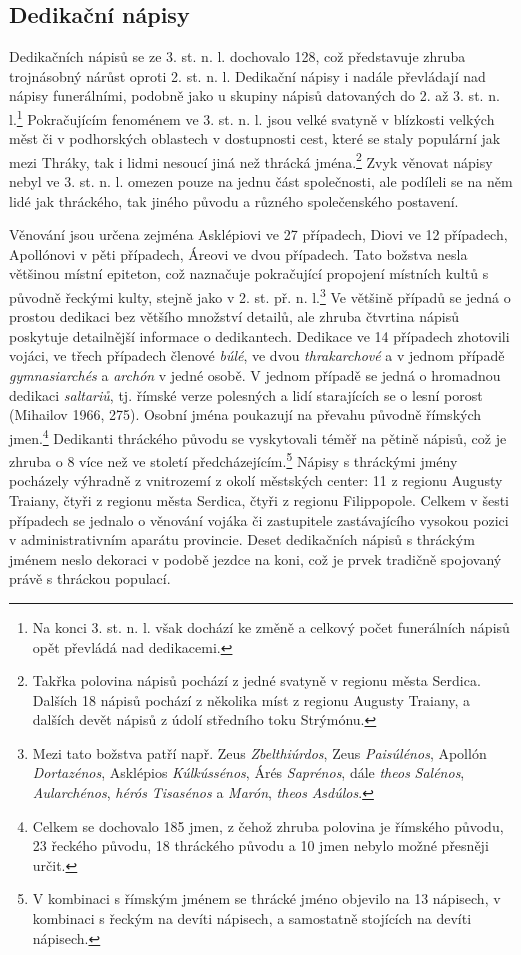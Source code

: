 \subsection[dedikační-nápisy-15]{Dedikační nápisy}

Dedikačních nápisů se ze 3. st. n. l. dochovalo 128, což představuje zhruba trojnásobný nárůst oproti 2. st. n. l. Dedikační nápisy i nadále převládají nad nápisy funerálními, podobně jako u skupiny nápisů datovaných do 2. až 3. st. n. l.\footnote{Na konci 3. st. n. l. však dochází ke změně a celkový počet funerálních nápisů opět převládá nad dedikacemi.} Pokračujícím fenoménem ve 3. st. n. l. jsou velké svatyně v blízkosti velkých měst či v podhorských oblastech v dostupnosti cest, které se staly populární jak mezi Thráky, tak i lidmi nesoucí jiná než thrácká jména.\footnote{Takřka polovina nápisů pochází z jedné svatyně v regionu města Serdica. Dalších 18 nápisů pochází z několika míst z regionu Augusty Traiany, a dalších devět nápisů z údolí středního toku Strýmónu.} Zvyk věnovat nápisy nebyl ve 3. st. n. l. omezen pouze na jednu část společnosti, ale podíleli se na něm lidé jak thráckého, tak jiného původu a různého společenského postavení.

Věnování jsou určena zejména Asklépiovi ve 27 případech, Diovi ve 12 případech, Apollónovi v pěti případech, Áreovi ve dvou případech. Tato božstva nesla většinou místní epiteton, což naznačuje pokračující propojení místních kultů s původně řeckými kulty, stejně jako v 2. st. př. n. l.\footnote{Mezi tato božstva patří např. Zeus {\em Zbelthiúrdos}, Zeus {\em Paisúlénos}, Apollón {\em Dortazénos}, Asklépios {\em Kúlkússénos}, Árés {\em Saprénos}, dále {\em theos} {\em Salénos}, {\em Aularchénos}, {\em hérós} {\em Tisasénos} a {\em Marón}, {\em theos} {\em Asdúlos}.} Ve většině případů se jedná o prostou dedikaci bez většího množství detailů, ale zhruba čtvrtina nápisů poskytuje detailnější informace o dedikantech. Dedikace ve 14 případech zhotovili vojáci, ve třech případech členové {\em búlé}, ve dvou {\em thrakarchové} a v jednom případě {\em gymnasiarchés} a {\em archón} v jedné osobě. V jednom případě se jedná o hromadnou dedikaci {\em saltariů}, tj. římské verze polesných a lidí starajících se o lesní porost (Mihailov 1966, 275). Osobní jména poukazují na převahu původně římských jmen.\footnote{Celkem se dochovalo 185 jmen, z čehož zhruba polovina je římského původu, 23  řeckého původu, 18  thráckého původu a 10  jmen nebylo možné přesněji určit.} Dedikanti thráckého původu se vyskytovali téměř na pětině nápisů, což je zhruba o 8  více než ve století předcházejícím.\footnote{V kombinaci s římským jménem se thrácké jméno objevilo na 13 nápisech, v kombinaci s řeckým na devíti nápisech, a samostatně stojících na devíti nápisech.} Nápisy s thráckými jmény pocházely výhradně z vnitrozemí z okolí městských center: 11 z regionu Augusty Traiany, čtyři z regionu města Serdica, čtyři z regionu Filippopole. Celkem v šesti případech se jednalo o věnování vojáka či zastupitele zastávajícího vysokou pozici v administrativním aparátu provincie. Deset dedikačních nápisů s thráckým jménem neslo dekoraci v podobě jezdce na koni, což je prvek tradičně spojovaný právě s thráckou populací.

